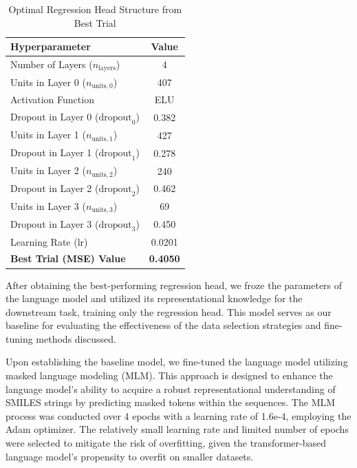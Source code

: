 \documentclass[11pt]{article}
\begin{document}
\begin{table}[h]
    \centering
    \caption{Optimal Regression Head Structure from Best Trial}
    \label{tab:regression_head}
    \begin{tabular}{l c}
        \hline
        \textbf{Hyperparameter} & \textbf{Value} \\
        \hline
        Number of Layers ($n_{\text{layers}}$) & 4 \\
        Units in Layer 0 ($n_{\text{units},0}$) & 407 \\
        Activation Function & ELU \\
        Dropout in Layer 0 ($\text{dropout}_0$) & 0.382 \\
        Units in Layer 1 ($n_{\text{units},1}$) & 427 \\
        Dropout in Layer 1 ($\text{dropout}_1$) & 0.278 \\
        Units in Layer 2 ($n_{\text{units},2}$) & 240 \\
        Dropout in Layer 2 ($\text{dropout}_2$) & 0.462 \\
        Units in Layer 3 ($n_{\text{units},3}$) & 69 \\
        Dropout in Layer 3 ($\text{dropout}_3$) & 0.450 \\
        Learning Rate (lr) & 0.0201 \\
        \hline
        \textbf{Best Trial (MSE) Value} & \textbf{0.4050} \\
        \hline
    \end{tabular}
\end{table}

After obtaining the best-performing regression head, we froze the parameters of the language model and utilized its representational knowledge for the downstream task, training only the regression head. This model serves as our baseline for evaluating the effectiveness of the data selection strategies and fine-tuning methods discussed. 

Upon establishing the baseline model, we fine-tuned the language model utilizing masked language modeling (MLM). This approach is designed to enhance the language model's ability to acquire a robust representational understanding of SMILES strings by predicting masked tokens within the sequences. The MLM process was conducted over 4 epochs with a learning rate of 1.6e-4, employing the Adam optimizer. The relatively small learning rate and limited number of epochs were selected to mitigate the risk of overfitting, given the transformer-based language model's propensity to overfit on smaller datasets.
\end{document}
